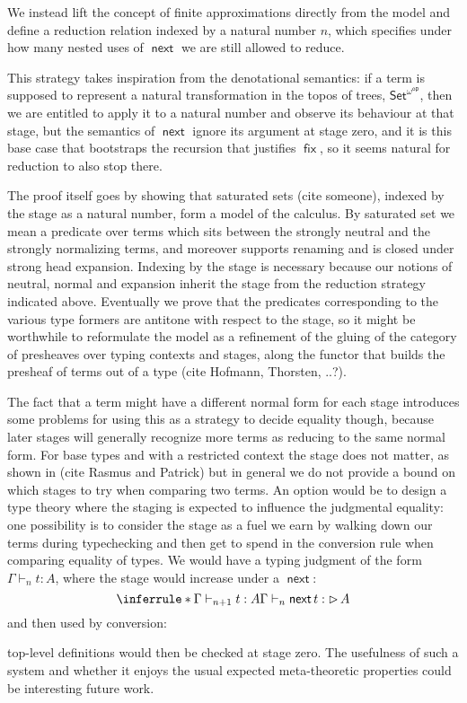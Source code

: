 \documentclass{book}
\DeclareMathOperator{\fix}{\mathsf{fix}}
\DeclareMathOperator{\Later}{\vartriangleright}
\DeclareMathOperator{\next}{\ensuremath{\mathsf{next}}}
\begin{document}
  We instead lift the concept of finite approximations directly from
  the model and define a reduction relation indexed by a natural
  number $n$, which specifies under how many nested uses of $\next$ we
  are still allowed to reduce.

  This strategy takes inspiration from the denotational semantics: if
  a term is supposed to represent a natural transformation in the
  topos of trees, $\mathsf{Set}^{\omega^\mathsf{op}}$, then we are
  entitled to apply it to a natural number and observe its behaviour
  at that stage, but the semantics of $\next$ ignore its argument at
  stage zero, and it is this base case that bootstraps the recursion
  that justifies $\fix$, so it seems natural for reduction to also
  stop there.

  The proof itself goes by showing that saturated sets (cite someone),
  indexed by the stage as a natural number, form a model of the
  calculus. By saturated set we mean a predicate over terms which sits
  between the strongly neutral and the strongly normalizing terms, and
  moreover supports renaming and is closed under strong head
  expansion. Indexing by the stage is necessary because our notions
  of neutral, normal and expansion inherit the stage from the
  reduction strategy indicated above.
  Eventually we prove that the predicates corresponding to the various
  type formers are antitone with respect to the stage, so it might be
  worthwhile to reformulate the model as a refinement of the gluing of
  the category of presheaves over typing contexts and stages, along the functor that
  builds the presheaf of terms out of a type (cite Hofmann, Thorsten, ..?).

  The fact that a term might have a different normal form for each
  stage introduces some problems for using this as a strategy to
  decide equality though, because later stages will generally
  recognize more terms as reducing to the same normal form.
  For base types and with a restricted context the stage does not
  matter, as shown in (cite Rasmus and Patrick) but in general we do
  not provide a bound on which stages to try when comparing two terms.
  An option would be to design a type theory where the staging is expected
  to influence the judgmental equality: one possibility is to consider
  the stage as a fuel we earn by walking down our terms during
  typechecking and then get to spend in the conversion rule when
  comparing equality of types.
  We would have a typing judgment of the form $\Gamma \vdash_n t : A$, where the stage would increase under a $\next$:
  \[
  \inferrule*{\Gamma \vdash_{n+1} t : A}
             {\Gamma \vdash_n \next t : \Later A}
  \]
  and then used by conversion:
  top-level definitions would then be checked at stage zero. The
  usefulness of such a system and whether it enjoys the usual expected
  meta-theoretic properties could be interesting future work.
\end{document}

